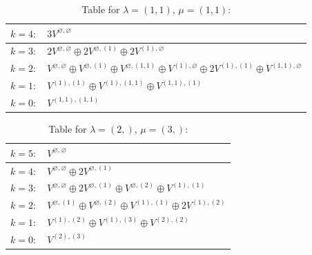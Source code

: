 \documentclass[a4paper,12pt]{article}
\begin{document}
\renewcommand{\arraystretch}{1.6} 
\begin{table}[H]
\centering
\caption{Table for $\lambda = (1, 1)$, $\mu = (1, 1)$:}
\begin{tabular}{|>{\centering\arraybackslash}p{15cm}|}
\hline
 $k = 4: \quad 3 V^{\varnothing, \varnothing} $ \\ \hline
 $k = 3: \quad 2 V^{\varnothing, \varnothing} \oplus 2 V^{\varnothing, (1)} \oplus 2 V^{(1), \varnothing} $ \\ \hline
 $k = 2: \quad V^{\varnothing, \varnothing} \oplus V^{\varnothing, (1)} \oplus V^{\varnothing, (1, 1)} \oplus V^{(1), \varnothing} \oplus 2 V^{(1), (1)} \oplus V^{(1, 1), \varnothing} $ \\ \hline
 $k = 1: \quad V^{(1), (1)} \oplus V^{(1), (1, 1)} \oplus V^{(1, 1), (1)} $ \\ \hline
 $k = 0: \quad V^{(1, 1), (1, 1)} $ \\ \hline
\end{tabular}
\end{table}

\renewcommand{\arraystretch}{1.6} 
\begin{table}[H]
\centering
\caption{Table for $\lambda = (2,)$, $\mu = (3,)$:}
\begin{tabular}{|>{\centering\arraybackslash}p{15cm}|}
\hline
 $k = 5: \quad V^{\varnothing, \varnothing} $ \\ \hline
 $k = 4: \quad V^{\varnothing, \varnothing} \oplus 2 V^{\varnothing, (1)} $ \\ \hline
 $k = 3: \quad V^{\varnothing, \varnothing} \oplus 2 V^{\varnothing, (1)} \oplus V^{\varnothing, (2)} \oplus V^{(1), (1)} $ \\ \hline
 $k = 2: \quad V^{\varnothing, (1)} \oplus V^{\varnothing, (2)} \oplus V^{(1), (1)} \oplus 2 V^{(1), (2)} $ \\ \hline
 $k = 1: \quad V^{(1), (2)} \oplus V^{(1), (3)} \oplus V^{(2), (2)} $ \\ \hline
 $k = 0: \quad V^{(2), (3)} $ \\ \hline
\end{tabular}
\end{table}
\end{document}

